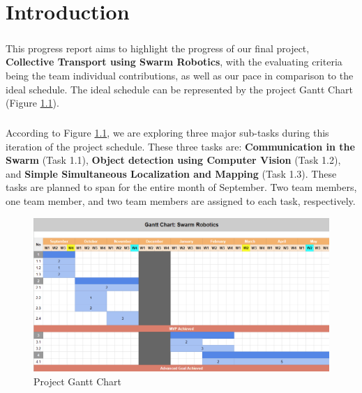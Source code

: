 \chapter{Introduction}

\paragraph*{}
This progress report aims to highlight the progress of our final project, \textbf{Collective Transport using Swarm Robotics}, with the evaluating criteria being the team individual contributions, as well as our pace in comparison to the ideal schedule. The ideal schedule can be represented by the project Gantt Chart (Figure \ref{fig:gantt_chart}).

\paragraph*{}
According to Figure \ref{fig:gantt_chart}, we are exploring three major sub-tasks during this iteration of the project schedule. These three tasks are: \textbf{Communication in the Swarm} (Task 1.1), \textbf{Object detection using Computer Vision} (Task 1.2), and \textbf{Simple Simultaneous Localization and Mapping} (Task 1.3). These tasks are planned to span for the entire month of September. Two team members, one team member, and two team members are assigned to each task, respectively.

\begin{figure}[H]
    \centering
    \includegraphics[width=1\linewidth]{assets/images/introduction/gantt_chart.png}
    \caption{Project Gantt Chart}
    \label{fig:gantt_chart}
\end{figure}
